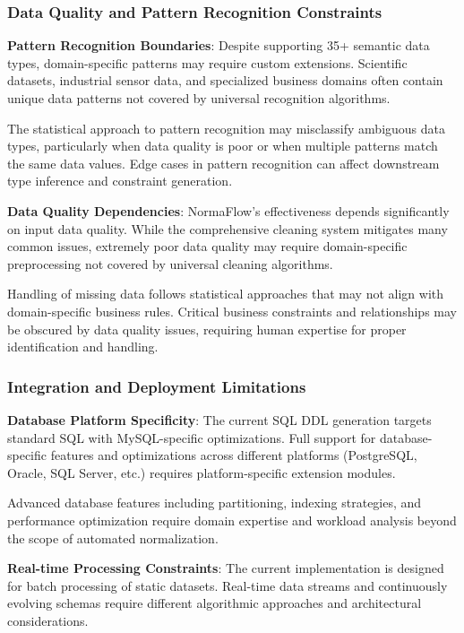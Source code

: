 \documentclass[acmsmall]{acmart}
\begin{document}
\subsubsection{Data Quality and Pattern Recognition Constraints}

\textbf{Pattern Recognition Boundaries}: Despite supporting 35+ semantic data types, domain-specific patterns may require custom extensions. Scientific datasets, industrial sensor data, and specialized business domains often contain unique data patterns not covered by universal recognition algorithms.

The statistical approach to pattern recognition may misclassify ambiguous data types, particularly when data quality is poor or when multiple patterns match the same data values. Edge cases in pattern recognition can affect downstream type inference and constraint generation.

\textbf{Data Quality Dependencies}: NormaFlow's effectiveness depends significantly on input data quality. While the comprehensive cleaning system mitigates many common issues, extremely poor data quality may require domain-specific preprocessing not covered by universal cleaning algorithms.

Handling of missing data follows statistical approaches that may not align with domain-specific business rules. Critical business constraints and relationships may be obscured by data quality issues, requiring human expertise for proper identification and handling.

\subsubsection{Integration and Deployment Limitations}

\textbf{Database Platform Specificity}: The current SQL DDL generation targets standard SQL with MySQL-specific optimizations. Full support for database-specific features and optimizations across different platforms (PostgreSQL, Oracle, SQL Server, etc.) requires platform-specific extension modules.

Advanced database features including partitioning, indexing strategies, and performance optimization require domain expertise and workload analysis beyond the scope of automated normalization.

\textbf{Real-time Processing Constraints}: The current implementation is designed for batch processing of static datasets. Real-time data streams and continuously evolving schemas require different algorithmic approaches and architectural considerations.
\end{document}
